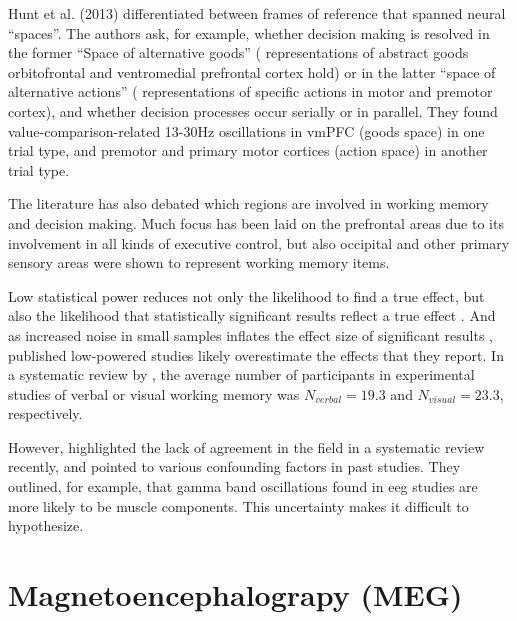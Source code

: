 Hunt et al. (2013) differentiated between frames of reference that spanned neural ``spaces''.
The authors ask, for example, whether decision making is resolved in the former “Space of alternative goods” ( representations of abstract goods orbitofrontal and ventromedial prefrontal cortex hold) or in the latter “space of alternative actions” ( representations of specific actions in motor and premotor cortex), and whether decision processes occur serially or in parallel. They found value-comparison-related 13-30Hz oscillations in vmPFC (goods space) in one trial type, and premotor and primary motor cortices (action space) in another trial type.

The literature has also debated which regions are involved in working memory and decision making.
Much focus has been laid on the prefrontal areas due to its involvement in all kinds of executive control, but also occipital and other primary sensory areas were shown to represent working memory items.

Low statistical power reduces not only the likelihood to find a true effect, but also the likelihood that statistically significant results reflect a true effect \citep{button2013power}.
And as increased noise in small samples inflates the effect size of significant results \citep{loken2017measurement}, published low-powered studies likely overestimate the effects that they report.
In a systematic review by \citet{pavlov2022oscillatory}, the average number of participants in experimental studies of verbal or visual working memory was $N_{verbal}=19.3$ and $N_{visual}=23.3$, respectively.

However, \citet{pavlov2022oscillatory} highlighted the lack of agreement in the field in a systematic review recently, and pointed to various confounding factors in past studies. They outlined, for example, that gamma band oscillations found in \gls{eeg} studies are more likely to be muscle components.
This uncertainty makes it difficult to hypothesize.

\section{Magnetoencephalograpy (MEG)}

